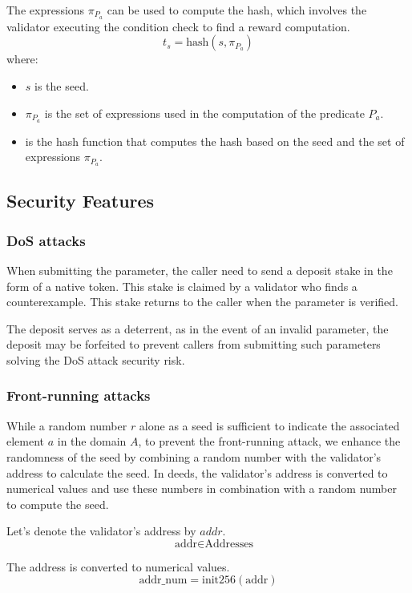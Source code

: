 \documentclass[runningheads]{llncs}
\begin{document}
 The expressions $\pi_{P_a}$ can be used to compute the hash, which involves the validator executing the condition check to find a reward computation.
\begin{equation}
t_s = \text{hash}(s, \pi_{P_{a}})
\end{equation}
where:
\begin{itemize}
    \item $s$ is the seed.
    \item $\pi_{P_{a}}$ is the set of expressions used in the computation of the predicate $P_a$.
    \item {} is the hash function that computes the hash based on the seed and the set of expressions $\pi_{P_{a}}$.
\end{itemize}
\subsection{Security Features}
\subsubsection{DoS attacks}
When submitting the parameter, the caller need to send a deposit stake in the form of a native token. This stake is claimed by a validator who finds a counterexample. This stake returns to the caller when the parameter is verified. 

The deposit serves as a deterrent, as in the event of an invalid parameter, the deposit may be forfeited to prevent callers from submitting such parameters solving the DoS attack security risk. 
\subsubsection{Front-running attacks}
While a random number $r$ alone as a seed is sufficient to indicate the associated element $a$ in the domain $A$, to prevent the front-running attack, we enhance the randomness of the seed by combining a random number with the validator's address to calculate the seed. In deeds, the validator's address is converted to numerical values and use these numbers in combination with a random number to compute the seed. 

Let's denote the validator's address by $addr$.
\begin{equation}
\quad \text{addr} \in \text{Addresses}
\end{equation}

The address is converted to numerical values.
\begin{equation}
\text{addr\_num} = \text{init256}(\text{addr})
\end{equation}
\end{document}
